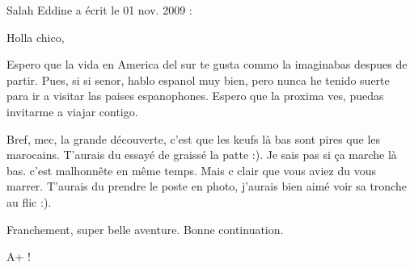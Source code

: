 \medskip
Salah Eddine a écrit le 01 nov. 2009 :
\begin{displayquote}
Holla chico,

Espero que la vida en America del sur te gusta commo la imaginabas despues de partir. Pues, si si senor, hablo espanol muy bien, pero nunca he tenido suerte para ir a visitar las paises espanophones. Espero que la proxima ves, puedas invitarme a viajar contigo.

Bref, mec, la grande découverte, c'est que les keufs là bas sont pires que les marocains. T'aurais du essayé de graissé la patte :). Je sais pas si ça marche là bas. c'est malhonnête en même temps. Mais c clair que vous aviez du vous marrer. T'aurais du prendre le poste en photo, j'aurais bien aimé voir sa tronche au flic :).

Franchement, super belle aventure. Bonne continuation.

A+ !
\end{displayquote}

\vfill
